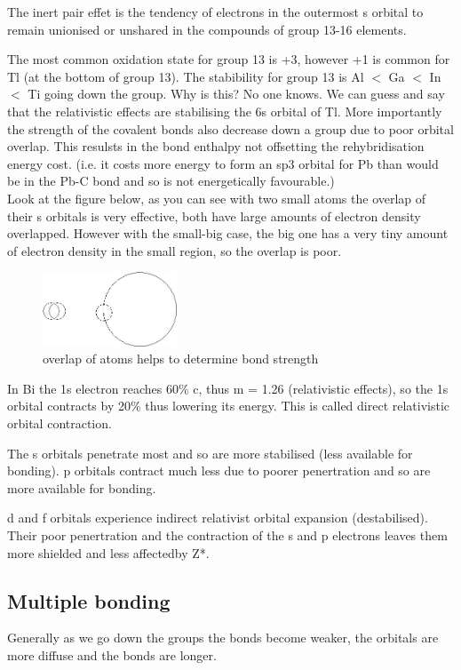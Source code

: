 \documentclass{article}
\begin{document}
    The inert pair effet is the tendency of electrons in the outermost s orbital to remain unionised or unshared
    in the compounds of group 13-16 elements. 

    The most common oxidation state for group 13 is +3, however +1 is common for Tl (at the bottom of group 13).
    The stabibility for group 13 is Al $<$ Ga $<$ In $<$ Ti going down the group. Why is this? No one knows.
    We can guess and say that the relativistic effects are stabilising the 6s orbital of Tl. More importantly the strength
    of the covalent bonds also decrease down a group due to poor orbital overlap. This resulsts in the bond
    enthalpy not offsetting the rehybridisation energy cost. (i.e. it costs more energy to form an sp3 orbital
    for Pb than would be in the Pb-C bond and so is not energetically favourable.)\\

    Look at the figure below, as you can see with two small atoms the overlap of their s orbitals is very effective,
    both have large amounts of electron density overlapped. However with the small-big case, the big one has a very
    tiny amount of electron density in the small region, so the overlap is poor.

    \begin{figure}[h]
        \centering
        \includegraphics[width=4cm]{over.jpg}
        \caption{overlap of atoms helps to determine bond strength}
    \end{figure}

    In Bi the 1s electron reaches 60\% c, thus m = 1.26 (relativistic effects), so the 1s orbital contracts
    by 20\% thus lowering its energy. This is called direct relativistic orbital contraction.

    The s orbitals penetrate most and so are more stabilised (less available for bonding). p orbitals contract
    much less due to poorer penertration and so are more available for bonding. 

    d and f orbitals experience indirect relativist orbital expansion (destabilised). Their poor penertration and
    the contraction of the s and p electrons leaves them more shielded and less affectedby Z*.

    \subsection{Multiple bonding}
    Generally as we go down the groups the bonds become weaker, the orbitals are more diffuse and the bonds
    are longer. 
\end{document}
